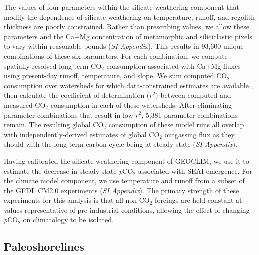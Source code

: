 \documentclass[9pt,twocolumn,twoside,lineno]{pnas-new}
\newcommand{\pCOtwo}{\textit{p}CO$_{2}$\xspace}
\newcommand{\COtwo}{CO$_{2}$\xspace}
\newcommand{\SI}{\textit{SI Appendix}\xspace}
\begin{document}
The values of four parameters within the silicate weathering component that modify the dependence of silicate weathering on temperature, runoff, and regolith thickness are poorly constrained. Rather than prescribing values, we allow these parameters and the Ca+Mg concentration of metamorphic and siliciclastic pixels to vary within reasonable bounds (\SI). This results in 93,600 unique combinations of these six parameters. For each combination, we compute spatially-resolved long-term \COtwo consumption associated with Ca+Mg fluxes using present-day runoff, temperature, and slope. We sum computed \COtwo consumption over watersheds for which data-constrained estimates are available \cite{Gaillardet1999a, Moquet2018a}, then calculate the coefficient of determination ($r^{2}$) between computed and measured \COtwo consumption in each of these watersheds. After eliminating parameter combinations that result in low $r^{2}$, 5,381 parameter combinations remain. The resulting global \COtwo consumption of these model runs all overlap with independently-derived estimates of global \COtwo outgassing flux as they should with the long-term carbon cycle being at steady-state (\SI).

Having calibrated the silicate weathering component of GEOCLIM, we use it to estimate the decrease in steady-state \pCOtwo associated with SEAI emergence. For the climate model component, we use temperature and runoff from a subset of the GFDL CM2.0 experiments \cite{Delworth2006b} (\SI). The primary strength of these experiments for this analysis is that all non-\COtwo forcings are held constant at values representative of pre-industrial conditions, allowing the effect of changing \pCOtwo on climatology to be isolated.

\subsection*{Paleoshorelines}
\end{document}
